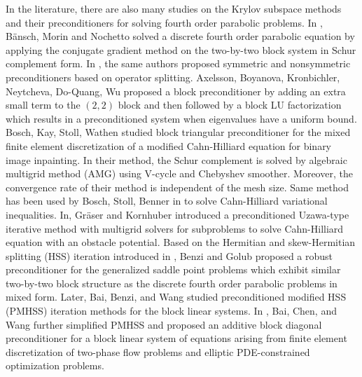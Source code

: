 \documentclass[smallcondensed]{svjour3}
\numberwithin{equation}{section} \numberwithin{table}{section}
\numberwithin{figure}{section}
\numberwithin{algorithm}{section}
\begin{document}
In the literature, there are also many studies on the Krylov subspace methods and their preconditioners for solving fourth order parabolic problems. In \cite{bansch2004surface,bansch2005finite}, B{\"a}nsch, Morin and Nochetto solved a discrete fourth order parabolic equation by applying the conjugate gradient method on the two-by-two block system in Schur complement form. In \cite{bansch2011preconditioning}, the same authors proposed symmetric and nonsymmetric preconditioners based on operator splitting. Axelsson, Boyanova, Kronbichler, Neytcheva, Do-Quang, Wu\cite{Axelsson2011,Boyanova2012,Axelsson2013,Boyanova2014} proposed a block preconditioner by adding an extra small term to the $(2, 2)$ block and then followed by a block LU factorization which results in a preconditioned system when eigenvalues have a uniform bound. Bosch, Kay, Stoll, Wathen \cite{Bosch2014a} studied block triangular preconditioner for the mixed finite element discretization of a modified Cahn-Hilliard equation for binary image inpainting. In their method, the Schur complement is solved by algebraic multigrid method (AMG) using V-cycle and Chebyshev smoother. Moreover, the convergence rate of their method is independent of the mesh size. Same method has been used by Bosch, Stoll, Benner in \cite{Bosch2014b} to solve Cahn-Hilliard variational inequalities. In\cite{graser2007preconditioned}, Gr{\"a}ser and Kornhuber introduced a preconditioned Uzawa-type iterative method with multigrid solvers for subproblems to solve Cahn-Hilliard equation with an obstacle potential. Based on the Hermitian and skew-Hermitian splitting (HSS) iteration introduced in \cite{bai2003hermitian}, Benzi and Golub \cite{benzi2004preconditioner} proposed a robust preconditioner for the generalized saddle point problems which exhibit similar two-by-two block structure as the discrete fourth order parabolic problems in mixed form. Later, Bai, Benzi, and Wang studied preconditioned modified HSS (PMHSS) iteration methods for the block linear systems. In \cite{Bai2013}, Bai, Chen, and Wang further simplified PMHSS and proposed an additive block diagonal preconditioner for a block linear system of equations arising from finite element discretization of two-phase flow problems and elliptic PDE-constrained optimization problems. 
\end{document}
